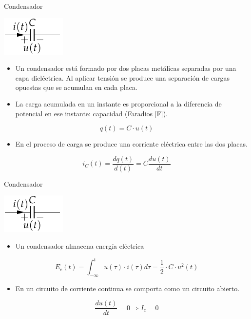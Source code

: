 \documentclass[aspectratio=169, usenames,svgnames,dvipsnames]{beamer}
\begin{document}
\begin{frame}[label={sec:org61b1387}]{Condensador}
\begin{center}
\includegraphics[height=0.2\textheight]{../figs/Condensador.pdf}
\end{center}

\begin{itemize}
\item Un \alert{condensador} está formado por dos placas metálicas separadas por una capa dieléctrica. Al aplicar tensión se produce una \alert{separación de cargas opuestas} que se \alert{acumulan} en cada placa.

\item La \alert{carga acumulada} en un instante es \alert{proporcional} a la \alert{diferencia de potencial} en ese instante: \alert{capacidad} (Faradios [F]).
\end{itemize}

\[
q(t) = C \cdot u(t)
\]

\begin{itemize}
\item En el proceso de carga se produce una corriente eléctrica entre las dos placas.
\end{itemize}
\[
i_C(t)=\frac{dq(t)}{d(t)}=C\frac{du(t)}{dt}
\]
\end{frame}
\begin{frame}[label={sec:org77a8db5}]{Condensador}
\begin{center}
\includegraphics[height=0.2\textheight]{../figs/Condensador.pdf}
\end{center}

\begin{itemize}
\item Un condensador almacena \alert{energía eléctrica}
\end{itemize}

\[
  E_c(t) = \int_{-\infty}^t u(\tau) \cdot i(\tau) d\tau = \frac{1}{2} \cdot C \cdot u^2(t)
\]

\begin{itemize}
\item En un circuito de corriente continua se comporta como un circuito abierto.
\end{itemize}

\begin{equation*}
  \frac{du(t)}{dt} = 0 \Rightarrow I_c = 0
\end{equation*}
\end{frame}
\end{document}
